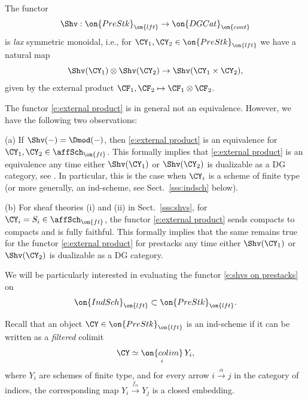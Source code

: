 \documentclass[9pt]{amsart}
\theoremstyle{definition}
\theoremstyle{remark}
\newcommand{\secref}[1]{Sect.~\ref{#1}}
\numberwithin{equation}{section}
\begin{document}
\sssec{}

The functor 
$$\Shv: \on{PreStk}_{\on{lft}}\to \on{DGCat}_{\on{cont}}$$ 
is \emph{lax} symmetric monoidal, i.e., for $\CY_1,\CY_2\in \on{PreStk}_{\on{lft}}$
we have a natural map
\begin{equation}  \label{e:external product}
\Shv(\CY_1)\otimes \Shv(\CY_2)\to \Shv(\CY_1\times \CY_2),
\end{equation}
given by the external product $\CF_1,\CF_2\mapsto \CF_1\otimes \CF_2$.

\sssec{}  \label{sss:external product}

The functor \eqref{e:external product} is in general not an equivalence. However, we have the following two observations:

\smallskip

\noindent(a) If $\Shv(-)=\Dmod(-)$, then \eqref{e:external product} is an equivalence for $\CY_1,\CY_2\in \affSch_{\on{ft}}$. 
This formally implies that \eqref{e:external product} is an equivalence any time either $\Shv(\CY_1)$ or $\Shv(\CY_2)$
is dualizable as a DG category, see \cite[Chapter 3, Proposition 3.1.7]{GR1}. In particular, this is the case
when $\CY_i$ is a scheme of finite type (or more generally, an ind-scheme, see \secref{sss:indsch} below).  

\medskip

\noindent(b) For sheaf theories (i) and (ii) in \secref{sss:shvs}, for $\CY_i=S_i\in \affSch_{\on{ft}}$, 
the functor \eqref{e:external product} sends compacts to compacts and is fully faithful. This formally implies 
that the same remains true for the functor \eqref{e:external product} for prestacks any time either 
$\Shv(\CY_1)$ or $\Shv(\CY_2)$ is dualizable as a DG category. 


\sssec{}   \label{sss:indsch}

We will be particularly interested in evaluating the functor \eqref{e:shvs on prestacks} on
$$\on{IndSch}_{\on{lft}}\subset \on{PreStk}_{\on{lft}}.$$

Recall that an object $\CY\in \on{PreStk}_{\on{lft}}$ is an ind-scheme if it can be written as a \emph{filtered} colimit
\begin{equation} \label{e:present ind-scheme}
\CY\simeq \underset{i}{\on{colim}}\, Y_i,
\end{equation}
where $Y_i$ are schemes of finite type, and for every arrow $i\overset{\alpha}\longrightarrow j$ in the category of indices, the corresponding map
$Y_i\overset{f_\alpha}\longrightarrow Y_j$ is a closed embedding.  
\end{document}
